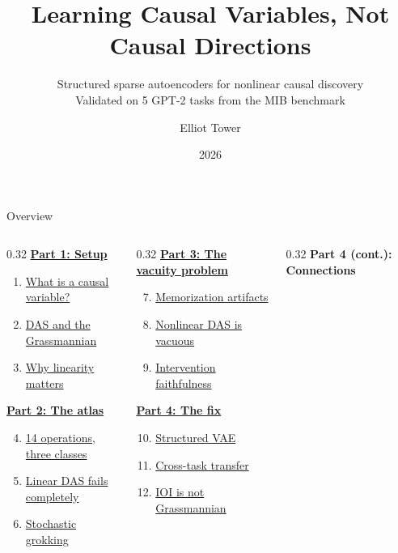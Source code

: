 \documentclass[aspectratio=169,11pt]{beamer}
\title{Learning Causal Variables, Not Causal Directions}
\subtitle{Structured sparse autoencoders for nonlinear causal discovery\\[0.3em]{\small Validated on 5 GPT-2 tasks from the MIB benchmark}}
\author{Elliot Tower}
\date{2026}
\institute{}
\begin{document}
\maketitle

\begin{frame}{Overview}
\begin{columns}[T]
\begin{column}{0.32\textwidth}
\textbf{\hyperlink{part1}{Part 1: Setup}}
\begin{enumerate}
  \item \hyperlink{sec1}{What is a causal variable?}
  \item \hyperlink{sec2}{DAS and the Grassmannian}
  \item \hyperlink{sec3}{Why linearity matters}
\end{enumerate}
\vspace{0.5em}
\textbf{\hyperlink{part2}{Part 2: The atlas}}
\begin{enumerate}
  \setcounter{enumi}{3}
  \item \hyperlink{sec4}{14 operations, three classes}
  \item \hyperlink{sec5}{Linear DAS fails completely}
  \item \hyperlink{sec6}{Stochastic grokking}
\end{enumerate}
\end{column}
\begin{column}{0.32\textwidth}
\textbf{\hyperlink{part3}{Part 3: The vacuity problem}}
\begin{enumerate}
  \setcounter{enumi}{6}
  \item \hyperlink{sec7}{Memorization artifacts}
  \item \hyperlink{sec8}{Nonlinear DAS is vacuous}
  \item \hyperlink{sec9}{Intervention faithfulness}
\end{enumerate}
\vspace{0.5em}
\textbf{\hyperlink{part4}{Part 4: The fix}}
\begin{enumerate}
  \setcounter{enumi}{9}
  \item \hyperlink{sec10}{Structured VAE}
  \item \hyperlink{sec11}{Cross-task transfer}
  \item \hyperlink{sec12}{IOI is not Grassmannian}
\end{enumerate}
\end{column}
\begin{column}{0.32\textwidth}
\textbf{Part 4 (cont.): Connections}

\end{column}
\end{columns}
\end{frame}
\end{document}
